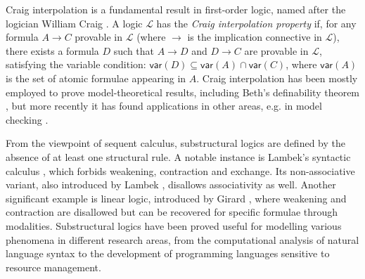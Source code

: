 \documentclass[sn-mathphys-num]{sn-jnl}%
\newcommand{\mc}[1]{\mathcal{#1}}
\newcommand{\mf}[1]{\mathsf{#1}}
\newcommand{\vars}[1]{\mf{var} (#1)}
\theoremstyle{thmstyleone}%
\theoremstyle{thmstyletwo}%
\theoremstyle{thmstylethree}%
\begin{document}

Craig interpolation is a fundamental result in first-order logic, named after the logician William Craig \cite{craig:interpolation:1957}.
A logic $\mc{L}$ has the \emph{Craig interpolation property} if, for any formula $A \to C$ provable in $\mc{L}$ (where $\to$ is the implication connective in $\mc{L}$), there exists a formula $D$ such that $A \to D$ and $D \to C$ are provable in $\mc{L}$, satisfying the variable condition: $\vars{D} \subseteq \vars{A} \cap \vars{C}$, where $\vars{A}$ is the set of atomic formulae appearing in $A$.
Craig interpolation has been mostly employed to prove model-theoretical results, including Beth's definability theorem \cite{Beth1953}, but more recently it has found applications in other areas, e.g. in model checking \cite{Henzinger2004}.

From the viewpoint of sequent calculus, substructural logics are defined by the absence of at least one structural rule.
A notable instance is Lambek's syntactic calculus \cite{lambek:mathematics:58}, which forbids weakening, contraction and exchange.
Its non-associative variant, also introduced by Lambek \cite{Lambek1961},
disallows associativity as well. Another significant example is linear logic, introduced by Girard \cite{girard:linear:87}, where weakening and contraction are disallowed but can be recovered for specific formulae through modalities.
Substructural logics have been proved useful for modelling various phenomena in different research areas, from the computational analysis of natural language syntax to the development of programming languages sensitive to resource management.
\end{document}
